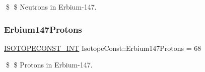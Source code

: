 \$ \$ Neutrons in Erbium-\/147. \mbox{\label{group___isotope_const-_erbium-_er147_ga8cf897c97cc0f5350ed4a29176633efb}} 
\subsubsection{\texorpdfstring{Erbium147\+Protons}{Erbium147Protons}}
{\footnotesize\ttfamily \mbox{\hyperlink{group___isotope_const-_macros_ga5f18360b3e99483a35c32d789e62621c}{I\+S\+O\+T\+O\+P\+E\+C\+O\+N\+S\+T\+\_\+\+I\+NT}} Isotope\+Const\+::\+Erbium147\+Protons = 68}

\$ \$ Protons in Erbium-\/147. 